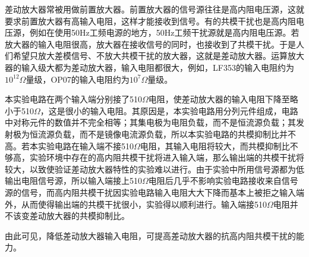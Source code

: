\documentclass[a4paper]{article}
\begin{document}
差动放大器常被用做前置放大器。前置放大器的信号源往往是高内阻电压源，这就要求前置放大器有高输入电阻，这样才能接收到信号。有的共模干扰也是高内阻电压源，例如在使用50Hz工频电源的地方，50Hz工频干扰源就是高内阻电压源。若放大器的输入电阻很高，放大器在接收信号的同时，也接收到了共模干扰。于是人们希望只放大差模信号、不放大共模干扰的放大器，这就是差动放大器。运算放大器的输入级大都为差动放大器，输入电阻都很大，例如，LF353的输入电阻约为$10^{12}$$\Omega$量级，OP07的输入电阻约为$10^7$$\Omega$量级。

本实验电路在两个输入端分别接了510$\Omega$电阻，使差动放大器的输入电阻下降至略小于510$\Omega$，这是很小的输入电阻。其原因是，本实验电路用分列元件组成，电路中对称元件的数值并不完全相等；其集电极为电阻负载，而不是恒流源负载；其发射极为恒流源负载，而不是镜像电流源负载，所以本实验电路的共模抑制比并不高。若本实验电路在输入端不接510$\Omega$电阻，其输入电阻将较大，而共模抑制比不够高，实验环境中存在的高内阻共模干扰将进入输入端，那么输出端的共模干扰将较大，以致使验证差动放大器特性的实验难以进行。由于实验中所用信号源都为低输出电阻信号源，所以输入端接上510$\Omega$电阻后几乎不影响实验电路接收来自信号源的信号，而高内阻共模干扰因实验电路输入电阻大大下降而基本上被拒之输入端外，从而使得输出端的共模干扰很小，实验得以顺利进行。输入端接510$\Omega$电阻并不该变差动放大器的共模抑制比。

由此可见，降低差动放大器输入电阻，可提高差动放大器的抗高内阻共模干扰的能力。
\end{document}
